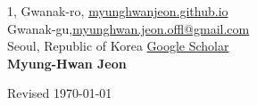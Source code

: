 \documentclass{cv} %
\begin{document}
1, Gwanak-ro,  \hfill \href{https://myunghwanjeon.github.io/}{myunghwanjeon.github.io}\\
Gwanak-gu,\hfill \href{mailto:myunghwan.jeon.offl@gmail.com}{myunghwan.jeon.offl@gmail.com}\\
Seoul, Republic of Korea \hfill \href{https://scholar.google.com/citations?user=ivOqySYAAAAJ}{Google Scholar} \\

\hfil{\namesize\bf Myung-Hwan Jeon}\hfil

\vspace{-3mm}





\clearpage








\vspace{0.5in}
\hfill Revised \today
\end{document}
